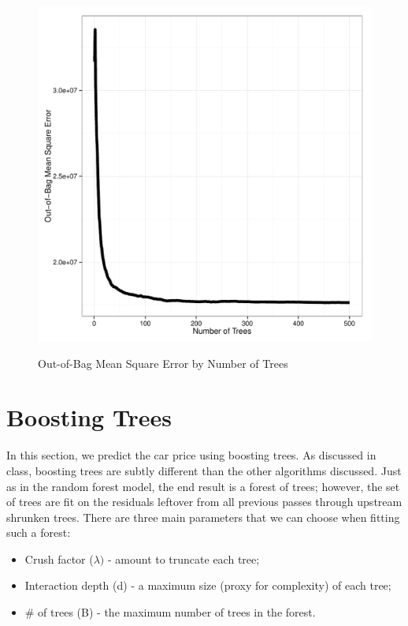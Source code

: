 \documentclass[11pt, fleqn]{article}
\begin{document}
\begin{figure}[!htb]
  \centering
  \caption{Out-of-Bag Mean Square Error by Number of Trees}
  \includegraphics[scale=.5]{rf_oob_mse.pdf}
  \label{fig:rf_oob_mse}
\end{figure}

\section{Boosting Trees}

In this section, we predict the car price using boosting trees.  As discussed in class, boosting trees are subtly different than the other algorithms discussed.  Just as in the random forest model, the end result is a forest of trees; however, the set of trees are fit on the residuals leftover from all previous passes through upstream shrunken trees.  There are three main parameters that we can choose when fitting such a forest:
\begin{itemize}
\item Crush factor ($\lambda)$ - amount to truncate each tree;
\item  Interaction depth (d) - a maximum size (proxy for complexity) of each tree;
\item  \# of trees (B) - the maximum number of trees in the forest.
\end{itemize}
\end{document}
